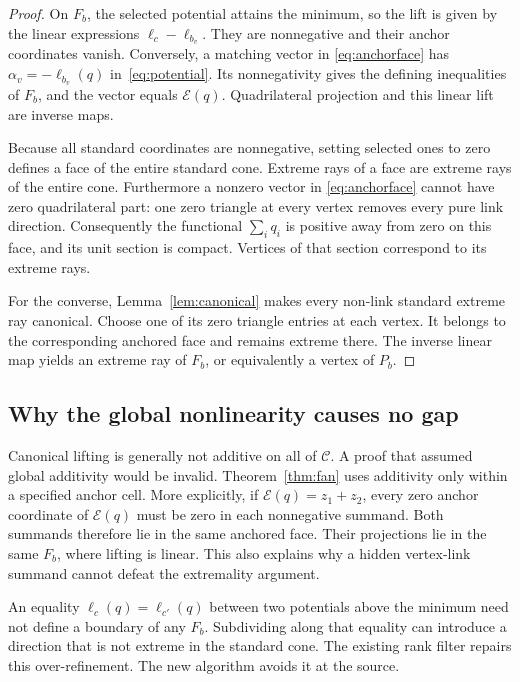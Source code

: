 \documentclass[11pt]{article}
\theoremstyle{definition}
\theoremstyle{remark}
\newcommand{\cone}{\mathcal C}\newcommand{\stdcone}{\mathcal K}
\newcommand{\lift}{\mathcal E}\newcommand{\poly}{\operatorname{poly}}
\begin{document}
\begin{proof}
On $F_b$, the selected potential attains the minimum, so the lift is given
by the linear expressions $\ell_c-\ell_{b_v}$. They are nonnegative and their
anchor coordinates vanish. Conversely, a matching vector in
\eqref{eq:anchorface} has
$\alpha_v=-\ell_{b_v}(q)$ in~\eqref{eq:potential}. Its nonnegativity gives
the defining inequalities of $F_b$, and the vector equals $\lift(q)$.
Quadrilateral projection and this linear lift are inverse maps.

Because all standard coordinates are nonnegative, setting selected ones to
zero defines a face of the entire standard cone. Extreme rays of a face are
extreme rays of the entire cone. Furthermore a nonzero vector in
\eqref{eq:anchorface} cannot have zero quadrilateral part: one zero triangle
at every vertex removes every pure link direction. Consequently the functional
$\sum_iq_i$ is positive away from zero on this face, and its unit section is
compact. Vertices of that section correspond to its extreme rays.

For the converse, Lemma~\ref{lem:canonical} makes every non-link standard
extreme ray canonical. Choose one of its zero triangle entries at each vertex.
It belongs to the corresponding anchored face and remains extreme there.
The inverse linear map yields an extreme ray of $F_b$, or equivalently a
vertex of $P_b$.
\end{proof}

\subsection{Why the global nonlinearity causes no gap}

Canonical lifting is generally not additive on all of $\cone$. A proof that
assumed global additivity would be invalid. Theorem~\ref{thm:fan} uses
additivity only within a specified anchor cell. More explicitly, if
$\lift(q)=z_1+z_2$, every zero anchor coordinate of $\lift(q)$ must be zero
in each nonnegative summand. Both summands therefore lie in the same anchored
face. Their projections lie in the same $F_b$, where lifting is linear.
This also explains why a hidden vertex-link summand cannot defeat the
extremality argument.

An equality $\ell_c(q)=\ell_{c'}(q)$ between two potentials above the
minimum need not define a boundary of any $F_b$. Subdividing along that
equality can introduce a direction that is not extreme in the standard cone.
The existing rank filter repairs this over-refinement. The new algorithm
avoids it at the source.
\end{document}

